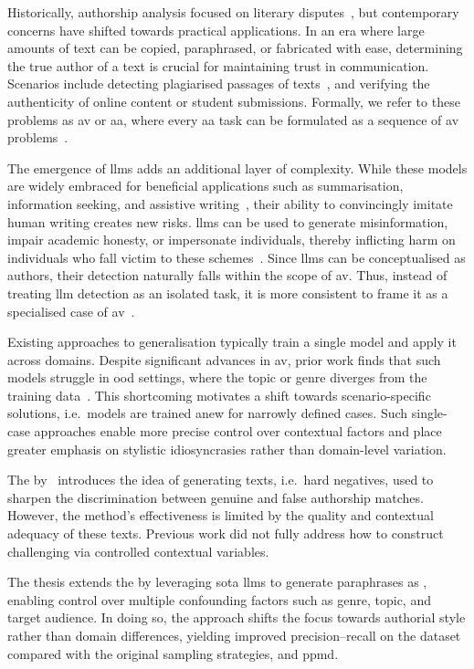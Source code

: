 Historically, authorship analysis focused on literary disputes~\citep{neal_surveying_2018,stamatatos_survey_2009}, but contemporary concerns have shifted towards practical applications.
In an era where large amounts of text can be copied, paraphrased, or fabricated with ease, determining the true author of a text is crucial for maintaining trust in communication. 
Scenarios include detecting plagiarised passages of texts~\citep{stein_intrinsic_2011}, and verifying the authenticity of online content or student submissions. 
Formally, we refer to these problems as \acf{av} or \acf{aa}, where every \ac{aa} task can be formulated as a sequence of \ac{av} problems~\citep{tyo_state_2022,barlas_cross_domain_2020}.

The emergence of \acp{llm} adds an additional layer of complexity. 
While these models are widely embraced for beneficial applications such as summarisation, information seeking, and assistive writing~\citep{wang_stumbling_2024}, their ability to convincingly imitate human writing creates new risks. 
\acp{llm} can be used to generate misinformation, impair academic honesty, or impersonate individuals, thereby inflicting harm on individuals who fall victim to these schemes~\citep{mitchell_detectgpt_2023,li_learning_2025,wang_stumbling_2024,bhattacharjee_fighting_2024}. 
Since \acp{llm} can be conceptualised as authors, their detection naturally falls within the scope of \ac{av}. 
Thus, instead of treating \ac{llm} detection as an isolated task, it is more consistent to frame it as a specialised case of \ac{av}~\citep{llm_detection_av_2025}.

Existing approaches to generalisation typically train a single model and apply it across domains.
Despite significant advances in \ac{av}, prior work finds that such models struggle in \ac{ood} settings, where the topic or genre diverges from the training data~\citep{Sundararajan_style_18,bischoff_importance_2020,li_learning_2025}. 
This shortcoming motivates a shift towards scenario-specific solutions, i.e.\ models are trained anew for narrowly defined cases. 
Such single-case approaches enable more precise control over contextual factors and place greater emphasis on stylistic idiosyncrasies rather than domain-level variation.

The \impAppr{} by \citet{koppel_determining_2014}\ introduces the idea of generating \imp{} texts, i.e.\ hard negatives, used to sharpen the discrimination between genuine and false authorship matches. 
However, the method's effectiveness is limited by the quality and contextual adequacy of these \imp{} texts. 
Previous work did not fully address how to construct challenging \imps{} via controlled contextual variables.

The thesis extends the \impAppr{} by leveraging \acl{sota} \acp{llm} to generate paraphrases as \imps{}, enabling control over multiple confounding factors such as genre, topic, and target audience. 
In doing so, the approach shifts the focus towards authorial style rather than domain differences, yielding improved precision–recall on the \dataStudent{} dataset compared with the original sampling strategies, \unmasking{} and \acs{ppmd}.
